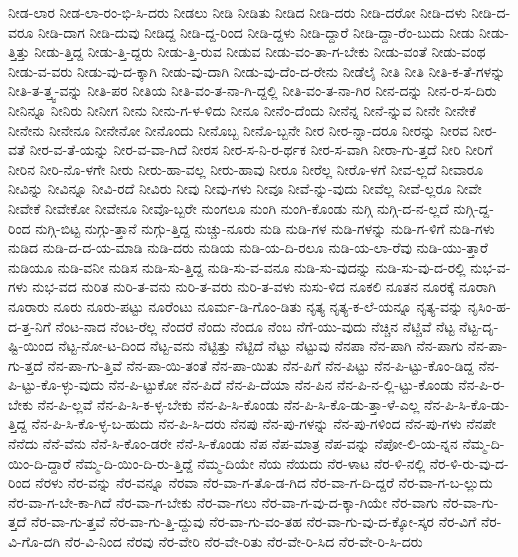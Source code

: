 {ನೀಡ-ಲಾರ
ನೀಡ-ಲಾ-ರಂ-ಭಿ-ಸಿ-ದರು
ನೀಡಲು
ನೀಡಿ
ನೀಡಿತು
ನೀಡಿದ
ನೀಡಿ-ದರು
ನೀಡಿ-ದರೋ
ನೀಡಿ-ದಳು
ನೀಡಿ-ದ-ವರೂ
ನೀಡಿ-ದಾಗ
ನೀಡಿ-ದುವು
ನೀಡಿದ್ದ
ನೀಡಿ-ದ್ದ-ರಿಂದ
ನೀಡಿ-ದ್ದಳು
ನೀಡಿ-ದ್ದಾರೆ
ನೀಡಿ-ದ್ದಾ-ರೆಂ-ಬುದು
ನೀಡು
ನೀಡು-ತ್ತಿತ್ತು
ನೀಡು-ತ್ತಿದ್ದ
ನೀಡು-ತ್ತಿ-ದ್ದರು
ನೀಡು-ತ್ತಿ-ರುವ
ನೀಡುವ
ನೀಡು-ವಂ-ತಾ-ಗ-ಬೇಕು
ನೀಡು-ವಂತೆ
ನೀಡು-ವಂಥ
ನೀಡು-ವ-ವರು
ನೀಡು-ವು-ದ-ಕ್ಕಾಗಿ
ನೀಡು-ವು-ದಾಗಿ
ನೀಡು-ವು-ದೆಂ-ದ-ರೇನು
ನೀಡೆಲೈ
ನೀತಿ
ನೀತಿ
ನೀತಿ-ಕ-ತೆ-ಗಳನ್ನು
ನೀತಿ-ತ-ತ್ತ್ವ-ವನ್ನು
ನೀತಿ-ಪರ
ನೀತಿಯ
ನೀತಿ-ವಂ-ತ-ನಾ-ಗಿ-ದ್ದಲ್ಲಿ
ನೀತಿ-ವಂ-ತ-ನಾ-ಗಿರ
ನೀನ-ದನ್ನು
ನೀನ-ರ-ಸ-ದಿರು
ನೀನಿನ್ನೂ
ನೀನಿರು
ನೀನೀಗ
ನೀನು
ನೀನು-ಗ-ಳ-ಳಿದು
ನೀನೂ
ನೀನೆಂ-ದೆಂದು
ನೀನೆನ್ನ
ನೀನೆ-ನ್ನುವ
ನೀನೇ
ನೀನೇಕೆ
ನೀನೇನು
ನೀನೇನೂ
ನೀನೇನೋ
ನೀನೊಂದು
ನೀನೊಬ್ಬ
ನೀನೊ-ಬ್ಬನೇ
ನೀರ
ನೀರ-ನ್ನಾ-ದರೂ
ನೀರನ್ನು
ನೀರವ
ನೀರ-ವತೆ
ನೀರ-ವ-ತೆ-ಯನ್ನು
ನೀರ-ವ-ವಾ-ಗಿದೆ
ನೀರಸ
ನೀರ-ಸ-ನಿ-ರ-ರ್ಥಕ
ನೀರ-ಸ-ವಾಗಿ
ನೀರಾ-ಗು-ತ್ತದೆ
ನೀರಿ
ನೀರಿಗೆ
ನೀರಿನ
ನೀರಿ-ನೊ-ಳಗೇ
ನೀರು
ನೀರು-ಹಾ-ವಲ್ಲ
ನೀರು-ಹಾವು
ನೀರೂ
ನೀರೆಲ್ಲ
ನೀರೊ-ಳಗೆ
ನೀವ-ಲ್ಲದೆ
ನೀವಾರೂ
ನೀವಿನ್ನು
ನೀವಿನ್ನೂ
ನೀವಿ-ರದೆ
ನೀವಿರು
ನೀವು
ನೀವು-ಗಳು
ನೀವೂ
ನೀವೆ-ನ್ನು-ವುದು
ನೀವೆಲ್ಲ
ನೀವೆ-ಲ್ಲರೂ
ನೀವೇ
ನೀವೇಕೆ
ನೀವೇಕೋ
ನೀವೇನೂ
ನೀವೊ-ಬ್ಬರೇ
ನುಂಗಲೂ
ನುಂಗಿ
ನುಂಗಿ-ಕೊಂಡು
ನುಗ್ಗಿ
ನುಗ್ಗಿ-ದ-ನ-ಲ್ಲದೆ
ನುಗ್ಗಿ-ದ್ದ-ರಿಂದ
ನುಗ್ಗಿ-ಬಿಟ್ಟ
ನುಗ್ಗು-ತ್ತಾನೆ
ನುಗ್ಗು-ತ್ತಿದ್ದ
ನುಚ್ಚು-ನೂರು
ನುಡಿ
ನುಡಿ-ಗಳ
ನುಡಿ-ಗಳನ್ನು
ನುಡಿ-ಗ-ಳಿಗೆ
ನುಡಿ-ಗಳು
ನುಡಿದ
ನುಡಿ-ದ-ದ-ಯ-ಮಾಡಿ
ನುಡಿ-ದರು
ನುಡಿಯ
ನುಡಿ-ಯ-ದಿ-ರಲೂ
ನುಡಿ-ಯ-ಲಾ-ರೆವು
ನುಡಿ-ಯು-ತ್ತಾರೆ
ನುಡಿಯೂ
ನುಡಿ-ವನೀ
ನುಡಿಸ
ನುಡಿ-ಸು-ತ್ತಿದ್ದ
ನುಡಿ-ಸು-ವ-ವನೂ
ನುಡಿ-ಸು-ವುದನ್ನು
ನುಡಿ-ಸು-ವು-ದ-ರಲ್ಲಿ
ನುಭ-ವ-ಗಳು
ನುಭ-ವದ
ನುರಿತ
ನುರಿ-ತ-ವನು
ನುರಿ-ತ-ವರು
ನುರಿ-ತ-ವಳು
ನುಸು-ಳಿದ
ನೂಕಲಿ
ನೂತನ
ನೂರಕ್ಕೆ
ನೂರಾಗಿ
ನೂರಾರು
ನೂರು
ನೂರು-ಪಟ್ಟು
ನೂರೆಂಟು
ನೂರ್ಮ-ಡಿ-ಗೊಂ-ಡಿತು
ನೃತ್ಯ
ನೃತ್ಯ-ಕ-ಲೆ-ಯನ್ನೂ
ನೃತ್ಯ-ವನ್ನು
ನೃಸಿಂ-ಹ-ದ-ತ್ತ-ನಿಗೆ
ನೆಂಟ-ನಾದ
ನೆಂಟ-ರೆಲ್ಲ
ನೆಂದರೆ
ನೆಂದು
ನೆಂದೂ
ನೆಂಬ
ನೆಗೆ-ಯು-ವುದು
ನೆಚ್ಚಿನ
ನೆಟ್ಚಿವೆ
ನೆಟ್ಟ
ನೆಟ್ಟ-ದೃ-ಷ್ಟಿ-ಯಿಂದ
ನೆಟ್ಟ-ನೋ-ಟ-ದಿಂದ
ನೆಟ್ಟ-ವನು
ನೆಟ್ಟಿತ್ತು
ನೆಟ್ಟಿದೆ
ನೆಟ್ಟು
ನೆಟ್ಟುವು
ನೆನಪಾ
ನೆನ-ಪಾಗಿ
ನೆನ-ಪಾಗು
ನೆನ-ಪಾ-ಗು-ತ್ತದೆ
ನೆನ-ಪಾ-ಗು-ತ್ತಿವೆ
ನೆನ-ಪಾ-ಯಿ-ತಂತೆ
ನೆನ-ಪಾ-ಯಿತು
ನೆನ-ಪಿಗೆ
ನೆನ-ಪಿಟ್ಟು
ನೆನ-ಪಿ-ಟ್ಟು-ಕೊಂ-ಡಿದ್ದ
ನೆನ-ಪಿ-ಟ್ಟು-ಕೊ-ಳ್ಳು-ವುದು
ನೆನ-ಪಿ-ಟ್ಟುಕೋ
ನೆನ-ಪಿದೆ
ನೆನ-ಪಿ-ದೆಯಾ
ನೆನ-ಪಿನ
ನೆನ-ಪಿ-ನ-ಲ್ಲಿ-ಟ್ಟು-ಕೊಂಡು
ನೆನ-ಪಿ-ರ-ಬೇಕು
ನೆನ-ಪಿ-ಲ್ಲವೆ
ನೆನ-ಪಿ-ಸಿ-ಕ-ಳ್ಳ-ಬೇಕು
ನೆನ-ಪಿ-ಸಿ-ಕೊಂಡು
ನೆನ-ಪಿ-ಸಿ-ಕೊ-ಡು-ತ್ತಾ-ಳೆ-ಎಲ್ಲ
ನೆನ-ಪಿ-ಸಿ-ಕೊ-ಡು-ತ್ತಿದ್ದ
ನೆನ-ಪಿ-ಸಿ-ಕೊ-ಳ್ಳ-ಬ-ಹುದು
ನೆನ-ಪಿ-ಸಿ-ದರು
ನೆನಪು
ನೆನ-ಪು-ಗಳನ್ನು
ನೆನ-ಪು-ಗಳಿಂದ
ನೆನ-ಪು-ಗಳು
ನೆನಪೇ
ನೆನೆದು
ನೆನೆ-ವೆನು
ನೆನೆ-ಸಿ-ಕೊಂ-ಡರೇ
ನೆನೆ-ಸಿ-ಕೊಂಡು
ನೆಪ
ನೆಪ-ಮಾತ್ರ
ನೆಪ-ವನ್ನು
ನೆಪೋ-ಲಿ-ಯ-ನ್ನನ
ನೆಮ್ಮ-ದಿ-ಯಿಂ-ದಿ-ದ್ದಾರೆ
ನೆಮ್ಮ-ದಿ-ಯಿಂ-ದಿ-ರು-ತ್ತಿದ್ದೆ
ನೆಮ್ಮ-ದಿಯೇ
ನೆಯ
ನೆಯದು
ನೆರ-ಳಾಟ
ನೆರ-ಳಿ-ನಲ್ಲಿ
ನೆರ-ಳಿ-ರು-ವು-ದ-ರಿಂದ
ನೆರಳು
ನೆರ-ವನ್ನು
ನೆರ-ವನ್ನೂ
ನೆರವಾ
ನೆರ-ವಾ-ಗ-ತೊ-ಡ-ಗಿದ
ನೆರ-ವಾ-ಗ-ದಿ-ದ್ದರೆ
ನೆರ-ವಾ-ಗ-ಬ-ಲ್ಲುದು
ನೆರ-ವಾ-ಗ-ಬೇ-ಕಾ-ಗಿದೆ
ನೆರ-ವಾ-ಗ-ಬೇಕು
ನೆರ-ವಾ-ಗಲು
ನೆರ-ವಾ-ಗ-ವು-ದ-ಕ್ಕಾ-ಗಿಯೇ
ನೆರ-ವಾಗು
ನೆರ-ವಾ-ಗು-ತ್ತದೆ
ನೆರ-ವಾ-ಗು-ತ್ತವೆ
ನೆರ-ವಾ-ಗು-ತ್ತಿ-ದ್ದುವು
ನೆರ-ವಾ-ಗು-ವಂ-ತಹ
ನೆರ-ವಾ-ಗು-ವು-ದ-ಕ್ಕೋ-ಸ್ಕರ
ನೆರ-ವಿಗೆ
ನೆರ-ವಿ-ಗೊ-ದಗಿ
ನೆರ-ವಿ-ನಿಂದ
ನೆರವು
ನೆರ-ವೇರಿ
ನೆರ-ವೇ-ರಿತು
ನೆರ-ವೇ-ರಿ-ಸಿದ
ನೆರ-ವೇ-ರಿ-ಸಿ-ದರು
}
